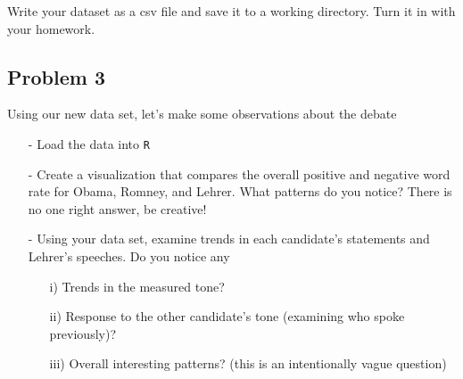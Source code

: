 \documentclass[12pt,letterpaper]{article}
\begin{document}
Write your dataset as a csv file and save it to a working directory. Turn it in with your homework. 


\subsection*{Problem 3}

Using our new data set, let's make some observations about the debate
\begin{itemize}
\item[-] Load the data into {\tt R} 
\item[-] Create a visualization that compares the overall positive and negative word rate for Obama, Romney, and Lehrer.  What patterns do you notice?  There is no one right answer, be creative!
\item[-] Using your data set, examine trends in each candidate's statements and Lehrer's speeches.  Do you notice any
\begin{itemize}
\item[i)] Trends in the measured tone?
\item[ii)] Response to the other candidate's tone (examining who spoke previously)?
\item[iii)] Overall interesting patterns? (this is an intentionally vague question)
\end{itemize}
\end{itemize}
\end{document}
